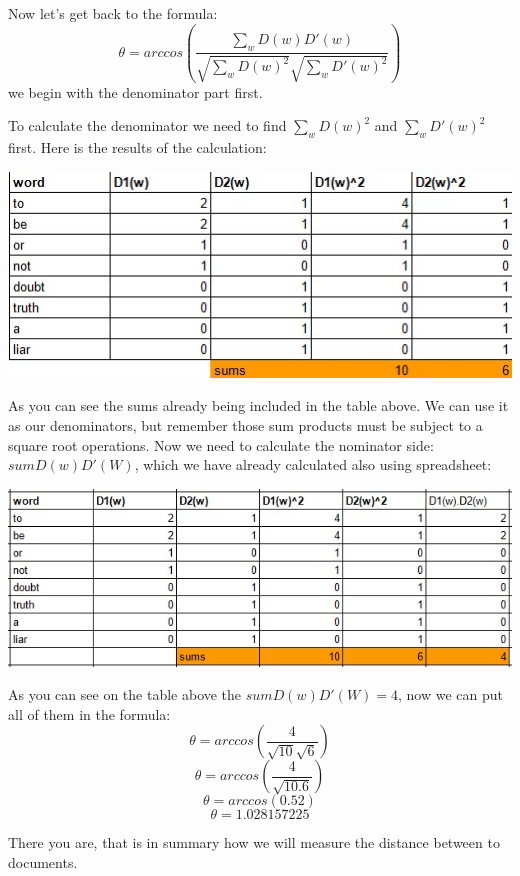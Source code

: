 \documentclass{article}
\begin{document}
    Now let's get back to the formula: 
    \[
      \theta = arccos \left( \frac{\sum_{w}{D(w)D'(w)}}{\sqrt{\sum_{w}{D(w)^{2}}} \sqrt{\sum_{w}{D'(w)^{2}}}}\right)  
    \]
    we begin with the denominator part first.

    \newpage
    To calculate the denominator we need to find $\sum_{w}{D(w)^{2}}$ and $\sum_{w}{D'(w)^{2}}$ first. Here is the results of the calculation:
    \begin{center}
        \includegraphics{square frequencies table.jpg}
    \end{center}

    As you can see the sums already being included in the table above.
    We can use it as our denominators, but remember those sum products must be subject to a square root operations.
    Now we need to calculate the nominator side: $sum{D(w)D'(W)}$, which we have already calculated also using spreadsheet:
    \begin{center}
        \includegraphics[scale=0.8]{inner product sum table.jpg}
    \end{center}

    As you can see on the table above the $sum{D(w)D'(W)} = 4$, now we can put all of them in the formula:
    \[\theta = arccos \left( \frac{4}{\sqrt{10} \sqrt{6}}\right)\]
    \[\theta = arccos \left( \frac{4}{\sqrt{10.6}}\right)\]
    \[\theta = arccos\left( 0.52\right)\]
    \[\theta = 1.028157225\]

    There you are, that is in summary how we will measure the distance between to documents. 
\end{document}
